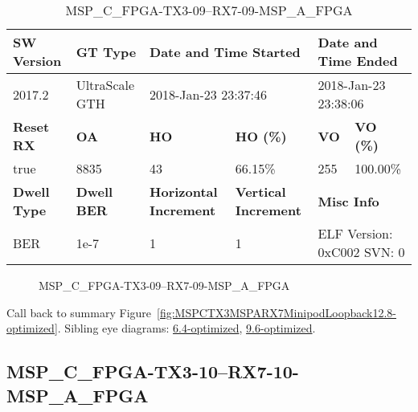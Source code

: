 \begin{table}[h]
\centering
\caption{MSP\_C\_FPGA-TX3-09--RX7-09-MSP\_A\_FPGA}
\label{tab:MSPCFPGATX309RX709MSPAFPGA12.8-optimized}
\begin{tabular}{@{}|l|l|l|l|l|l|@{}}
\toprule
\textbf{SW Version}                & \textbf{GT Type}   & \multicolumn{2}{l|}{\textbf{Date and Time Started}}            & \multicolumn{2}{l|}{\textbf{Date and Time Ended}}        \\ \midrule
2017.2                       & UltraScale GTH          & \multicolumn{2}{l|}{2018-Jan-23 23:37:46}                   & \multicolumn{2}{l|}{2018-Jan-23 23:38:06}               \\ \midrule
\textbf{Reset RX}                  & \textbf{OA} & \textbf{HO}   & \textbf{HO (\%)} & \textbf{VO} & \textbf{VO (\%)} \\ \midrule
true & 8835        & 43          & 66.15\%        & 255        & 100.00\%       \\ \midrule
\textbf{Dwell Type}                & \textbf{Dwell BER} & \textbf{Horizontal Increment} & \textbf{Vertical Increment}    & \multicolumn{2}{l|}{\textbf{Misc Info}}                  \\ \midrule
BER                            & 1e-7        & 1        & 1           & \multicolumn{2}{l|}{ELF Version: 0xC002 SVN: 0}                         \\ \bottomrule
\end{tabular}
\end{table}

\begin{figure}[h]
\caption{MSP\_C\_FPGA-TX3-09--RX7-09-MSP\_A\_FPGA} \label{fig:MSPCFPGATX309RX709MSPAFPGA12.8-optimized}
\end{figure}

Call back to summary Figure~\ref{fig:MSPCTX3MSPARX7MinipodLoopback12.8-optimized}.
Sibling eye diagrams: \hyperref[sec:MSPCFPGATX309RX709MSPAFPGA6.4-optimized]{6.4-optimized}, \hyperref[sec:MSPCFPGATX309RX709MSPAFPGA9.6-optimized]{9.6-optimized}.

\clearpage
\newpage


\subsection{MSP\_C\_FPGA-TX3-10--RX7-10-MSP\_A\_FPGA}\label{sec:MSPCFPGATX310RX710MSPAFPGA12.8-optimized}

